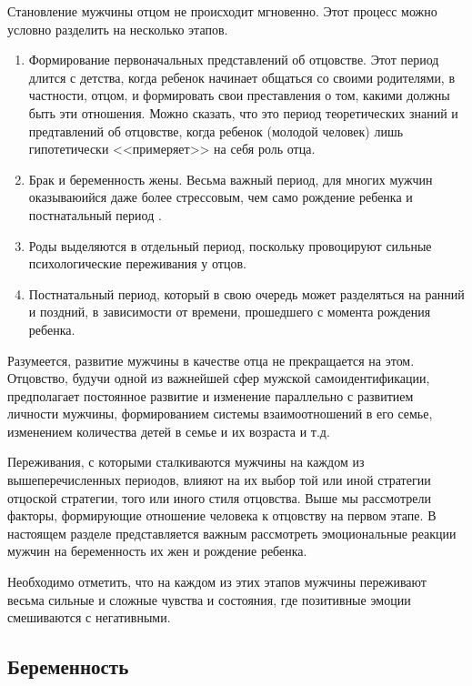 \documentclass{../../common/thesisbyxetex}
\begin{document}
Становление мужчины отцом не происходит мгновенно. Этот процесс можно условно разделить на
несколько этапов.

\begin{enumerate}
	\item Формирование первоначальных представлений об отцовстве. Этот период длится с детства,
когда ребенок начинает общаться со своими родителями, в частности, отцом, и формировать свои
преставления о том, какими должны быть эти отношения. Можно сказать, что это период теоретических
знаний и предтавлений об отцовстве, когда ребенок (молодой человек) лишь гипотетически <<примеряет>>
на себя роль отца.

\item Брак и беременность жены. Весьма важный период, для многих мужчин  оказываюийся даже более
стрессовым, чем само рождение ребенка и постнатальный период  \cite[313]{flit}.

\item Роды выделяются в отдельный период, поскольку провоцируют сильные психологические переживания
у отцов.

\item Постнатальный период, который в свою очередь может разделяться на ранний и поздний, в
зависимости от времени, прошедшего с момента рождения ребенка.

\end{enumerate}

Разумеется, развитие мужчины в качестве отца не прекращается на этом. Отцовство, будучи одной из
важнейшей сфер мужской самоидентификации, предполагает постоянное развитие и изменение параллельно
с развитием личности мужчины, формированием системы взаимоотношений в его семье, изменением
количества детей в семье и их возраста и т.д.

Переживания, с которыми сталкиваются мужчины на каждом из вышеперечисленных периодов, влияют на их
выбор той или иной стратегии отцоской стратегии, того или иного стиля отцовства. Выше мы
рассмотрели факторы, формирующие отношение человека к отцовству на первом этапе.  В настоящем
разделе представляется важным рассмотреть эмоциональные реакции мужчин на беременность их жен и
рождение ребенка.

Необходимо отметить, что на каждом из этих этапов мужчины переживают весьма сильные и сложные
чувства и состояния, где позитивные эмоции смешиваются с негативными.

\subsection{Беременность}
\end{document}
